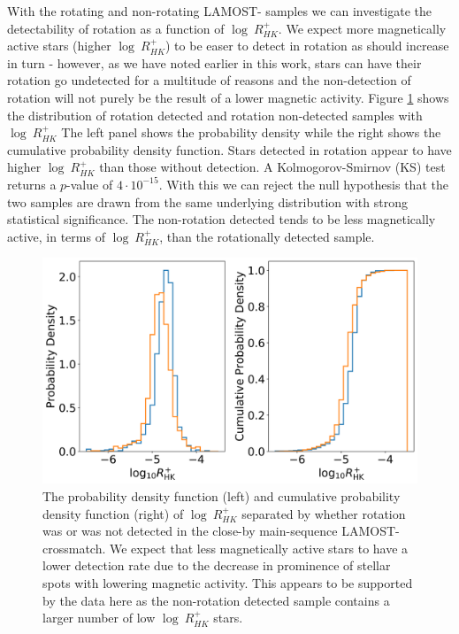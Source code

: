 With the rotating and non-rotating LAMOST-\kepler{} samples we can investigate the detectability of rotation as a function of $\log \ R^{+}_{HK}$.
We expect more magnetically active stars (higher $\log \ R^{+}_{HK}$) to be easer to detect in rotation as \rper{} should increase in turn - however, as we have noted earlier in this work, stars can have their rotation go undetected for a multitude of reasons and the non-detection of rotation will not purely be the result of a lower magnetic activity.
Figure \ref{fig:pdf_cdf} shows the distribution of rotation detected and rotation non-detected samples with $\log \ R^{+}_{HK}$
The left panel shows the probability density while the right shows the cumulative probability density function.
Stars detected in rotation appear to have higher $\log \ R^{+}_{HK}$ than those without detection.
A Kolmogorov-Smirnov (KS) test returns a $p$-value of $4 \cdot10^{-15}$.
With this we can reject the null hypothesis that the two samples are drawn from the same underlying distribution with strong statistical significance.
The non-rotation detected tends to be less magnetically active, in terms of $\log \ R^{+}_{HK}$, than the rotationally detected sample.

\begin{figure}
\centering
    \includegraphics[width=\textwidth]{Figures/rot_gap_figures/pdf_cdf.png}
    \caption{
    	The probability density function (left) and cumulative probability density function (right) of $\log \ R^{+}_{HK}$ separated by whether rotation was or was not detected in the close-by main-sequence LAMOST-\kepler{} crossmatch. 
	We expect that less magnetically active stars to have a lower detection rate due to the decrease in prominence of stellar spots with lowering magnetic activity. This appears to be supported by the data here as the non-rotation detected sample contains a larger number of low $\log \ R^{+}_{HK}$ stars.}
    \label{fig:pdf_cdf}
\end{figure}

